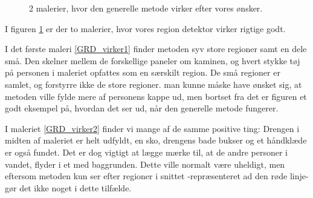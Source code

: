 \begin{figure}[!h]
{        	\label{GRD_virker1}}\hspace{1em}
		\hspace{1em}
        \caption[]{2 malerier, hvor den generelle metode virker efter vores ønsker.}
     \label{generelde_region_detektor_virker}
\end{figure}

I figuren \ref{generelde_region_detektor_virker} er der to malerier, hvor
vores region detektor virker rigtige godt. 

I det første maleri \ref{GRD_virker1} finder metoden syv store regioner
samt en dele små. Den skelner mellem de forskellige paneler om kaminen,
og hvert stykke tøj på personen i maleriet opfattes som en særskilt
region. De små regioner er samlet, og forstyrre ikke de store regioner.
man kunne måske have ønsket sig, at metoden ville fylde mere af
personens kappe ud, men bortset fra det er figuren et godt eksempel på,
hvordan det ser ud, når den generelle metode fungerer.

I maleriet \ref{GRD_virker2} finder vi mange af de samme positive ting:
Drengen i midten af maleriet er helt udfyldt, en sko, drengens bade
bukser og et håndklæde er også fundet. Det er dog vigtigt at lægge mærke
til, at de andre personer i vandet, flyder i et med baggrunden. Dette
ville normalt være uheldigt, men eftersom metoden kun ser efter regioner
i snittet -repræsenteret ad den røde linje- gør det ikke noget i dette
tilfælde.

